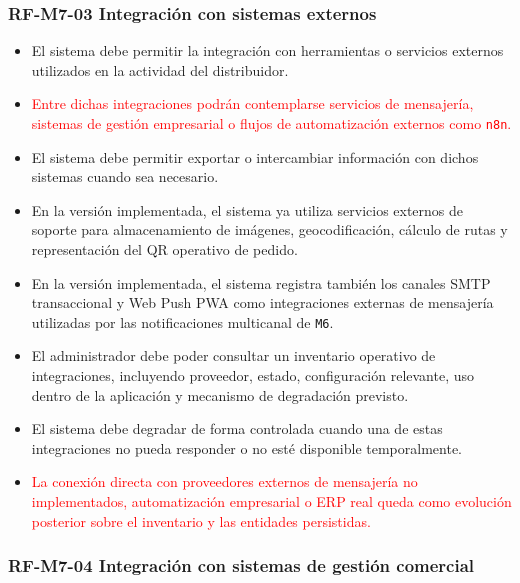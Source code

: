 \vspace{-0.75em}
\subsubsection{RF-M7-03 Integración con sistemas externos}
\vspace{-1em}

\begin{itemize}
    \item El sistema debe permitir la integración con herramientas o servicios externos utilizados en la actividad del distribuidor.
    \item \textcolor{red}{Entre dichas integraciones podrán contemplarse servicios de mensajería, sistemas de gestión empresarial o flujos de automatización externos como \texttt{n8n}.}
    \item El sistema debe permitir exportar o intercambiar información con dichos sistemas cuando sea necesario.
    \item En la versión implementada, el sistema ya utiliza servicios externos de soporte para almacenamiento de imágenes, geocodificación, cálculo de rutas y representación del QR operativo de pedido.
    \item En la versión implementada, el sistema registra también los canales SMTP transaccional y Web Push PWA como integraciones externas de mensajería utilizadas por las notificaciones multicanal de \texttt{M6}.
    \item El administrador debe poder consultar un inventario operativo de integraciones, incluyendo proveedor, estado, configuración relevante, uso dentro de la aplicación y mecanismo de degradación previsto.
    \item El sistema debe degradar de forma controlada cuando una de estas integraciones no pueda responder o no esté disponible temporalmente.
    \item \textcolor{red}{La conexión directa con proveedores externos de mensajería no implementados, automatización empresarial o ERP real queda como evolución posterior sobre el inventario y las entidades persistidas.}
\end{itemize}

\vspace{-0.75em}
\subsubsection{RF-M7-04 Integración con sistemas de gestión comercial}
\vspace{-1em}

